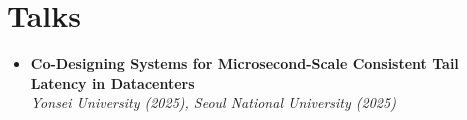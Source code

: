 \documentclass[letterpaper,11pt]{article}
\makeatletter
\newcommand{\resumeSubheading}[4]{
  \vspace{-1pt}\item
    \begin{tabular*}{0.97\textwidth}{l@{\extracolsep{\fill}}r}
      \textbf{#1} & #2 \\
      \textit{\small#3} & \textit{\small #4} \\
    \end{tabular*}\vspace{-5pt}
}
\newcommand{\resumeSubItem}[2]{
  \item\small{
    \textbf{#1}{ #2 \vspace{-2pt}}
  }\vspace{-4pt}
}
\newcommand{\resumeSubHeadingListStart}{\begin{itemize}[leftmargin=*]}
\newcommand{\resumeSubHeadingListEnd}{\end{itemize}}
\makeatother
\begin{document}
\section{Talks}
\resumeSubHeadingListStart
    \item\small{
      \textbf{Co-Designing Systems for Microsecond-Scale Consistent Tail Latency in Datacenters} \\
      \hfill \textit{Yonsei University (2025), Seoul National University (2025)}
    }
\resumeSubHeadingListEnd


  
% 
%  



   
  
   
  
   

  
\end{document}
